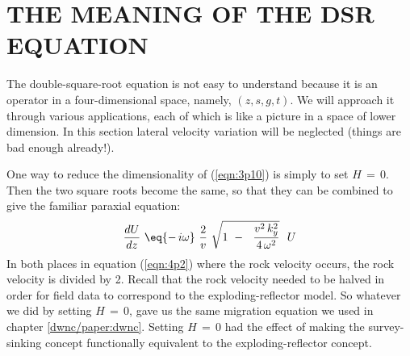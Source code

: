 \section{THE MEANING OF THE DSR EQUATION}
\par
The double-square-root equation
is not easy to understand because it is an operator in a
four-dimensional space, namely,  $(z,s,g,t)$.
We will approach it through various applications, each of which is like a
picture in a space of lower dimension.
In this section lateral velocity variation will be neglected
(things are bad enough already!).
\par
One way to reduce the dimensionality of (\ref{eqn:3p10})
is simply to set  $H \,=\, 0$.
Then the two square roots become the same, so that they can be
combined to give the familiar paraxial equation:
\begin{equation}
{dU \over dz }\  \eq 
{ -\,i  \omega } \ {2 \over v }\ \sqrt  { 1 \ -\ 
\  { v^2 \, k_y^2   \over  4 \, \omega^2 } } \ \  U
\label{eqn:4p2}
\end{equation}
In both places in equation (\ref{eqn:4p2}) where the rock velocity occurs,
the rock velocity is divided by 2.
Recall that the rock velocity needed to be halved in order for field
data to correspond to the exploding-reflector model.
So whatever we did by setting  $H \,=\, 0$,
gave us the same migration equation we used in chapter \ref{dwnc/paper:dwnc}.
Setting  $H\,=\,0$  had the effect of making the survey-sinking concept
functionally equivalent to the exploding-reflector concept.

